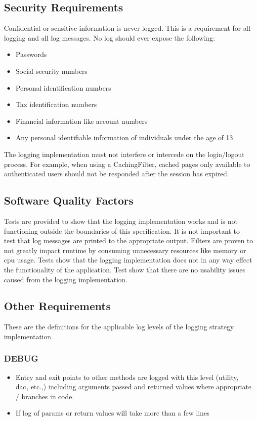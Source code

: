 \documentclass[12pt]{report}
\begin{document}
\subsection{Security Requirements}
Confidential or sensitive information is never logged. This is a requirement for all logging and all log messages. No log should ever
expose the following:
\begin{itemize}
  \item Passwords
  \item Social security numbers
  \item Personal identification numbers
  \item Tax identification numbers
  \item Financial information like account numbers 
  \item Any personal identifiable information of individuals under the age of 13
\end{itemize}

The logging implementation must not interfere or intercede on the login/logout process. For example, when using a CachingFilter, cached pages
only available to authenticated users should not be responded after the session has expired.

\subsection{Software Quality Factors}
Tests are provided to show that the logging implementation works and is not functioning outside the boundaries of this specification. It is not
important to test that log messages are printed to the appropriate output. Filters are proven to not greatly impact runtime by consuming
unnecessary resources like memory or cpu usage. Tests show that the logging implementation does not in any way effect the functionality of the
application. Test show that there are no usability issues caused from the logging implementation.

\subsection{Other Requirements}
These are the definitions for the applicable log levels of the logging strategy implementation.
\subsubsection{DEBUG}
\begin{itemize}
    \item Entry and exit points to other methods are logged with this level (utility, dao, etc.,) including arguments passed and returned values where appropriate / branches in code.
    \item If log of params or return values will take more than a few lines
\end{itemize}
\end{document}
